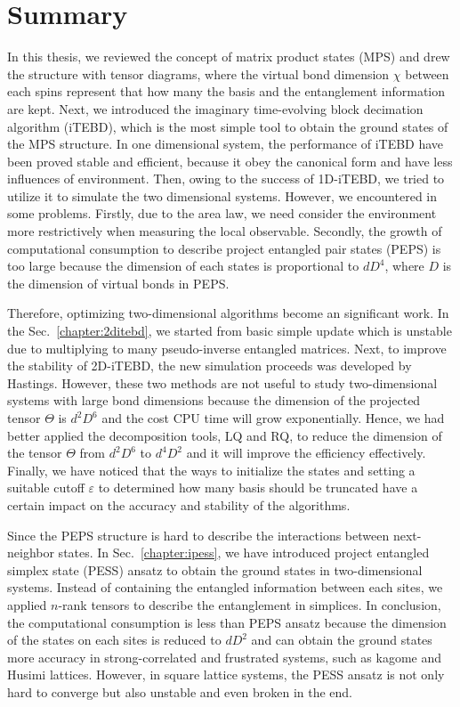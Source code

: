 \chapter{Summary}
\label{chapter:summary}

In this thesis, we reviewed the concept of matrix product states (MPS) and drew the structure with tensor diagrams, where the virtual bond dimension $\chi$ between each spins represent that how many the basis and the entanglement information are kept. Next, we introduced the imaginary time-evolving block decimation algorithm (iTEBD), which is the most simple tool to obtain the ground states of the MPS structure. In one dimensional system, the performance of iTEBD have been proved stable and efficient, because it obey the canonical form and have less influences of environment. Then, owing to the success of 1D-iTEBD, we tried to utilize it to simulate the two dimensional systems. However, we encountered in some problems. Firstly, due to the area law, we need consider the environment more restrictively when measuring the local observable. Secondly, the growth of computational consumption to describe project entangled pair states (PEPS) is too large because the dimension of each states is proportional to $dD^4$, where $D$ is the dimension of virtual bonds in PEPS.

Therefore, optimizing two-dimensional algorithms become an significant work. In the Sec.~\ref{chapter:2ditebd}, we started from basic simple update which is unstable due to multiplying to many pseudo-inverse entangled matrices. Next, to improve the stability of 2D-iTEBD, the new simulation proceeds was developed by Hastings. However, these two methods are not useful to study two-dimensional systems with large bond dimensions because the dimension of the projected tensor $\Theta$ is $d^2D^6$ and the cost CPU time will grow exponentially. Hence, we had better applied the decomposition tools, LQ and RQ, to reduce the dimension of the tensor $\Theta$ from $d^2D^6$ to $d^4D^2$ and it will improve the efficiency effectively. Finally, we have noticed that the ways to initialize the states and setting a suitable cutoff $\varepsilon$ to determined how many basis should be truncated have a certain impact on the accuracy and stability of the algorithms. 

Since the PEPS structure is hard to describe the interactions between next-neighbor states. In Sec.~\ref{chapter:ipess}, we have introduced project entangled simplex state (PESS) ansatz to obtain the ground states in two-dimensional systems. Instead of containing the entangled information between each sites, we applied $n$-rank tensors to describe the entanglement in simplices. In conclusion, the computational consumption is less than PEPS ansatz because the dimension of the states on each sites is reduced to $dD^2$ and can obtain the ground states more accuracy in strong-correlated and frustrated systems, such as kagome and Husimi lattices. However, in square lattice systems, the PESS ansatz is not only hard to converge but also unstable and even broken in the end.

